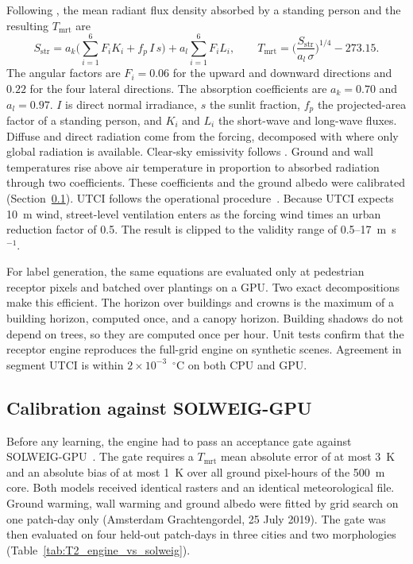 \documentclass[preprint,12pt,authoryear]{elsarticle}
\newcommand{\degC}{\ensuremath{^\circ}C}
\newcommand{\tmrt}{\ensuremath{T_\mathrm{mrt}}}
\begin{document}
Following \citet{thorsson2007}, the mean radiant flux density absorbed by a standing person and the resulting \tmrt{} are
\begin{equation}
  S_\mathrm{str} = a_k\Big(\sum_{i=1}^{6} F_i K_i + f_p\, I\, s\Big) + a_l \sum_{i=1}^{6} F_i L_i ,\qquad
  \tmrt = \Big(\frac{S_\mathrm{str}}{a_l\,\sigma}\Big)^{1/4} - 273.15 .
\end{equation}
The angular factors are $F_i = 0.06$ for the upward and downward directions and $0.22$ for the four lateral directions. The absorption coefficients are $a_k = 0.70$ and $a_l = 0.97$. $I$ is direct normal irradiance, $s$ the sunlit fraction, $f_p$ the projected-area factor of a standing person, and $K_i$ and $L_i$ the short-wave and long-wave fluxes. Diffuse and direct radiation come from the forcing, decomposed with \citet{erbs1982} where only global radiation is available. Clear-sky emissivity follows \citet{prata1996}. Ground and wall temperatures rise above air temperature in proportion to absorbed radiation through two coefficients. These coefficients and the ground albedo were calibrated (Section~\ref{sec:calib}). UTCI follows the operational procedure~\citep{brode2012,tartarini2020}. Because UTCI expects 10~m wind, street-level ventilation enters as the forcing wind times an urban reduction factor of 0.5. The result is clipped to the validity range of 0.5--17~m~s$^{-1}$.

For label generation, the same equations are evaluated only at pedestrian receptor pixels and batched over plantings on a GPU. Two exact decompositions make this efficient. The horizon over buildings and crowns is the maximum of a building horizon, computed once, and a canopy horizon. Building shadows do not depend on trees, so they are computed once per hour. Unit tests confirm that the receptor engine reproduces the full-grid engine on synthetic scenes. Agreement in segment UTCI is within $2\times10^{-3}$~\degC{} on both CPU and GPU.

\subsection{Calibration against SOLWEIG-GPU}\label{sec:calib}

Before any learning, the engine had to pass an acceptance gate against SOLWEIG-GPU~\citep{kamath2026}. The gate requires a \tmrt{} mean absolute error of at most 3~K and an absolute bias of at most 1~K over all ground pixel-hours of the 500~m core. Both models received identical rasters and an identical meteorological file. Ground warming, wall warming and ground albedo were fitted by grid search on one patch-day only (Amsterdam Grachtengordel, 25 July 2019). The gate was then evaluated on four held-out patch-days in three cities and two morphologies (Table~\ref{tab:T2_engine_vs_solweig}).
\end{document}
